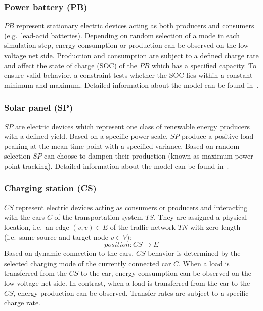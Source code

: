 \subsubsection*{Power battery (PB)}

$PB$ represent stationary electric devices acting as both producers and consumers (e.g.\ lead-acid batteries). 
Depending on random selection of a mode in each simulation step, energy consumption or production can be observed on the low-voltage net side. Production and consumption are subject to a defined charge rate and affect the state of charge (SOC) of the $PB$ which has a specified capacity.
To ensure valid behavior, a constraint tests whether the SOC lies within a constant minimum and maximum. Detailed information about the model can be found in~\cite{hackenberg2014rapid}.

\subsubsection*{Solar panel (SP)}

$SP$ are electric devices which represent one class of renewable energy producers with a defined yield. Based on a specific power scale, $SP$ produce a positive load peaking at the mean time point with a specified variance. Based on random selection $SP$ can choose to dampen their production (known as maximum power point tracking). Detailed information about the model can be found in~\cite{hackenberg2014rapid}.

\subsubsection*{Charging station (CS)}
\label{section:charging_station}

$CS$ represent electric devices acting as consumers or producers and interacting with the cars $C$ of the transportation system $TS$. They are assigned a physical location, i.e.\ an edge $(v,v) \in E$ of the traffic network $TN$ with zero length (i.e.\ same source and target node $v \in V$):
$$\mathit{position}: CS \to E$$ 
 Based on dynamic connection to the cars, $CS$ behavior is determined by the selected charging mode of the currently connected car $C$. 
 When a load is transferred from the $CS$ to the car, energy consumption can be observed on the low-voltage net side. In contrast, when a load is transferred from the car to the $CS$, energy production can be observed. Transfer rates are subject to a specific charge rate.